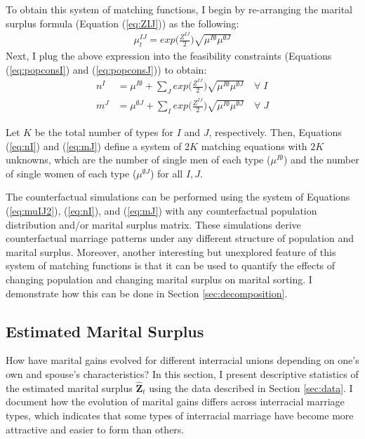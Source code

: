To obtain this system of matching functions, I begin by re-arranging the marital surplus formula (Equation (\ref{eq:ZIJ})) as the following:
 \begin{align}
	\mu^{IJ}_t = exp \Big(\frac{Z^{IJ}}{2} \Big)\sqrt{\mu^{I\emptyset} \mu^{\emptyset J}} \label{eq:muIJ2}
\end{align} 
Next, I plug the above expression into the feasibility constraints (Equations (\ref{eq:popconsI}) and (\ref{eq:popconsJ})) to obtain:
\begin{align}
	n^I &= \mu^{I\emptyset} + \sum_J exp \Big(\frac{Z^{IJ}}{2} \Big)\sqrt{\mu^{I\emptyset} \mu^{\emptyset J}} \quad \forall \; I \label{eq:nI} \\ 
	m^J &= \mu^{\emptyset J} + \sum_I exp \Big(\frac{Z^{IJ}}{2} \Big)\sqrt{\mu^{I\emptyset} \mu^{\emptyset J}} \quad \forall \; J \label{eq:mJ}
\end{align}

Let $K$ be the total number of types for $I$ and $J$, respectively. Then, Equations (\ref{eq:nI}) and (\ref{eq:mJ}) define a system of $2K$ matching equations with $2K$ unknowns, which are the number of single men of each type  ($\mu^{I\emptyset}$) and the number of single women of each type ($\mu^{\emptyset J}$) for all $I, J$. 

 The counterfactual simulations can be performed using the system of Equations (\ref{eq:muIJ2}), (\ref{eq:nI}), and (\ref{eq:mJ}) with any counterfactual population distribution and/or marital surplus matrix. These simulations derive counterfactual marriage patterns under any different structure of population and marital surplus. Moreover, another interesting but unexplored feature of this system of matching functions is that it can be used to quantify the effects of changing population and changing marital surplus on marital sorting. I demonstrate how this can be done in Section \ref{sec:decomposition}.	


\subsection{Estimated Marital Surplus} \label{sec:ZIJestimates}



 How have marital gains evolved for different interracial unions depending on one's own and spouse's characteristics? In this section, I present descriptive statistics of the estimated marital surplus $\hat{\mathbf{Z}}_t$ using the data described in Section \ref{sec:data}. I document how the evolution of marital gains differs across interracial marriage types, which indicates that some types of interracial marriage have become more attractive and easier to form than others. %

